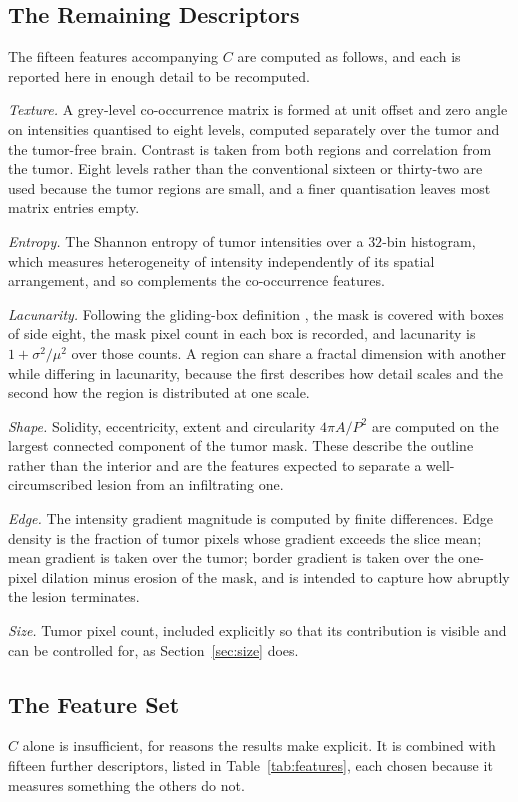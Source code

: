 \documentclass[journal]{IEEEtran}
\begin{document}
\subsection{The Remaining Descriptors}
The fifteen features accompanying $C$ are computed as follows, and each is
reported here in enough detail to be recomputed.

\emph{Texture.} A grey-level co-occurrence matrix \cite{haralick1973} is formed
at unit offset and zero angle on intensities quantised to eight levels, computed
separately over the tumor and the tumor-free brain. Contrast is taken from both
regions and correlation from the tumor. Eight levels rather than the conventional
sixteen or thirty-two are used because the tumor regions are small, and a finer
quantisation leaves most matrix entries empty.

\emph{Entropy.} The Shannon entropy of tumor intensities over a $32$-bin
histogram, which measures heterogeneity of intensity independently of its spatial
arrangement, and so complements the co-occurrence features.

\emph{Lacunarity.} Following the gliding-box definition \cite{allain1991}, the
mask is covered with boxes of side eight, the mask pixel count in each box is
recorded, and lacunarity is $1 + \sigma^2/\mu^2$ over those counts. A region can
share a fractal dimension with another while differing in lacunarity, because the
first describes how detail scales and the second how the region is distributed at
one scale.

\emph{Shape.} Solidity, eccentricity, extent and circularity
$4\pi A / P^2$ are computed on the largest connected component of the tumor mask.
These describe the outline rather than the interior and are the features expected
to separate a well-circumscribed lesion from an infiltrating one.

\emph{Edge.} The intensity gradient magnitude is computed by finite differences.
Edge density is the fraction of tumor pixels whose gradient exceeds the slice
mean; mean gradient is taken over the tumor; border gradient is taken over the
one-pixel dilation minus erosion of the mask, and is intended to capture how
abruptly the lesion terminates.

\emph{Size.} Tumor pixel count, included explicitly so that its contribution is
visible and can be controlled for, as Section~\ref{sec:size} does.

\subsection{The Feature Set}
$C$ alone is insufficient, for reasons the results make explicit. It is combined
with fifteen further descriptors, listed in Table~\ref{tab:features}, each chosen
because it measures something the others do not.
\end{document}
